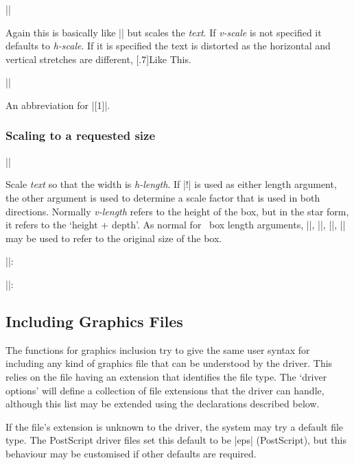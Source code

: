 \begin{decl}
|\scalebox|
\end{decl}

Again this is basically like |\mbox| but scales the \emph{text}.
If \emph{v-scale} is not specified it defaults to \emph{h-scale}.
If it is specified the text is distorted as the horizontal and
vertical stretches are different, \scalebox{3}[.7]{Like This}.


\begin{decl}
||
\end{decl}

An abbreviation for |\scalebox{-1}[1]|.

\subsubsection{Scaling to a requested size}

\begin{decl}
|\resizebox|\star{}
\end{decl}

 Scale \emph{text} so that the width is \emph{h-length}.
 If |!| is used as either length argument, the other argument is used
 to determine a scale factor that is used in both directions.
 Normally \emph{v-length} refers to the height of the box, but in the
 star form, it refers to the `height +  depth'.
 As normal for \LaTeXe\ box length arguments, |\height|,
 |\width|, |\totalheight|, |\depth| may be used to refer to the
 original size of the box.

||:

||:

\subsection{Including Graphics Files}
The functions for graphics inclusion try to give the same user syntax
for including any kind of graphics file that can be understood by the
driver. This relies on the file having an extension that identifies
the file type. The `driver options' will define a collection of file
extensions that the driver can handle, although this list may be
extended using the declarations described below.

If the file's extension is unknown to the driver, the system may try a
default file type. The PostScript driver files set this default to be
|eps| (PostScript), but this behaviour may be customised if other
defaults are required.

